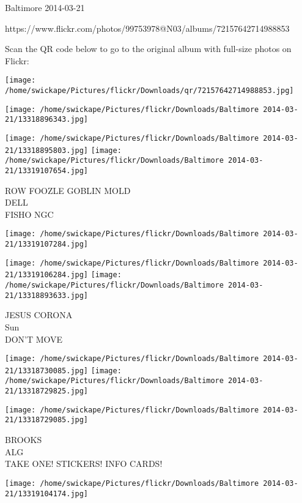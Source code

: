 \documentclass[10pt,letterpaper]{article}
\begin{document}
Baltimore 2014-03-21

https://www.flickr.com/photos/99753978@N03/albums/72157642714988853

Scan the QR code below to go to the original album with full-size photos on Flickr:

\texttt{[image: /home/swickape/Pictures/flickr/Downloads/qr/72157642714988853.jpg]}
\pagebreak

\texttt{[image: /home/swickape/Pictures/flickr/Downloads/Baltimore 2014-03-21/13318896343.jpg]}

\vspace{0.25in}
\texttt{[image: /home/swickape/Pictures/flickr/Downloads/Baltimore 2014-03-21/13318895803.jpg]}
\texttt{[image: /home/swickape/Pictures/flickr/Downloads/Baltimore 2014-03-21/13319107654.jpg]}

ROW FOOZLE GOBLIN MOLD\\
DELL\\
FISHO NGC\\
\pagebreak

\texttt{[image: /home/swickape/Pictures/flickr/Downloads/Baltimore 2014-03-21/13319107284.jpg]}

\vspace{0.25in}
\texttt{[image: /home/swickape/Pictures/flickr/Downloads/Baltimore 2014-03-21/13319106284.jpg]}
\texttt{[image: /home/swickape/Pictures/flickr/Downloads/Baltimore 2014-03-21/13318893633.jpg]}

JESUS CORONA\\
Sun\\
DON'T MOVE\\
\pagebreak

\texttt{[image: /home/swickape/Pictures/flickr/Downloads/Baltimore 2014-03-21/13318730085.jpg]}
\texttt{[image: /home/swickape/Pictures/flickr/Downloads/Baltimore 2014-03-21/13318729825.jpg]}

\texttt{[image: /home/swickape/Pictures/flickr/Downloads/Baltimore 2014-03-21/13318729085.jpg]}

BROOKS\\
ALG\\
TAKE ONE!  STICKERS!  INFO CARDS!\\
\pagebreak

\texttt{[image: /home/swickape/Pictures/flickr/Downloads/Baltimore 2014-03-21/13319104174.jpg]}
\end{document}
